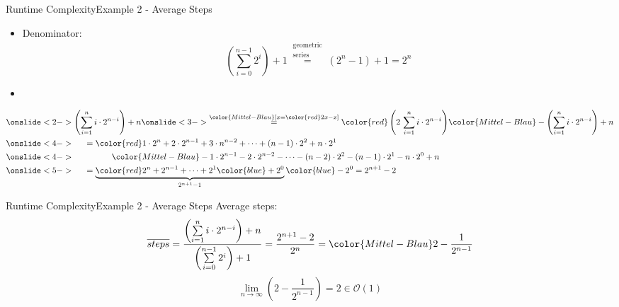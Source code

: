 \begin{frame}{Runtime Complexity}{Example 2 - Average Steps}
  \begin{itemize}
    \item
      Denominator:
      \begin{displaymath}
        \left(\sum_{i=0}^{n-1} 2^i \right) + 1
        \stackrel{\begin{array}{c}
          \text{geometric}\\
          \text{series}
        \end{array}}{=}
        (2^n - 1) + 1 = 2^n
      \end{displaymath}
    \item {}
  \end{itemize}
  \begin{alignat*}{4}
    & \onslide<2->{\left(\sum_{i=1}^n i \cdot 2^{n-i}\right) + n}
     \onslide<3->{\stackrel{\color{Mittel-Blau}[x = {\color{red}2x} - x]}{=}
        {\color{red}\left(2 \, \sum_{i=1}^n i \cdot 2^{n-i}\right)}
        {\color{Mittel-Blau}- \left(\sum_{i=1}^n i \cdot 2^{n-i}\right)} + n}\\
    &\onslide<4->{\hspace*{1.5em} = {\color{red}1 \cdot 2^n + 2 \cdot 2^{n-1} +
    3 \cdot n^{n-2} + \dots + (n-1) \cdot 2^2 + n \cdot 2^1}}\\
    & \onslide<4->{\hspace{4.5em}{\color{Mittel-Blau}- 1 \cdot 2^{n-1} - 2 \cdot
    2^{n-2} - \dots - (n-2) \cdot 2^2 - (n-1) \cdot 2^1 - n \cdot 2^0} + n}\\
    & \onslide<5->{\hspace*{1.5em} = \underbrace{{\color{red}2^n + 2^{n-1} +
    \dots +2^1} {\color{blue}+ 2^0}}_{2^{n+1}-1}{\color{blue} - 2^0}
      = 2^{n+1} - 2}
  \end{alignat*}
\end{frame}


\begin{frame}{Runtime Complexity}{Example 2 - Average Steps}
  {\color{Mittel-Blau}Average steps}:
  \begin{displaymath}
    \overline{steps}
    = \frac{
      \left(\sum\limits_{i=1}^n i \cdot 2^{n-i}\right) + n
    }{\left(\sum\limits_{i=0}^{n-1} 2^i \right) + 1}
    = \frac{2^{n+1} - 2}{2^n}
    = {\color{Mittel-Blau}2 - \frac{1}{2^{n-1}}}
  \end{displaymath}
  \begin{displaymath}
    \lim_{n \to \infty} \left(2 - \frac{1}{2^{n-1}}\right) = 2
    \in \mathcal{O}(1)
  \end{displaymath}
\end{frame}

